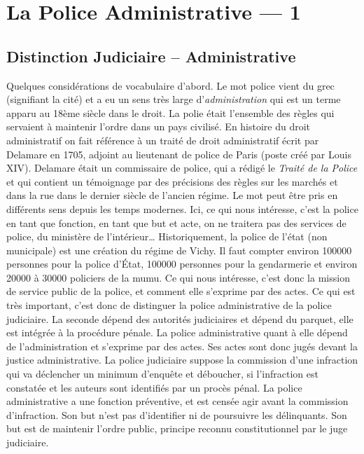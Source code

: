 \documentclass[math]{cours}
\begin{document}
\section{La Police Administrative --- 1}
\subsection{Distinction Judiciaire -- Administrative}
Quelques considérations de vocabulaire d'abord.
Le mot police vient du grec (signifiant la cité) et a eu un sens très large d'\emph{administration} qui est un terme apparu au 18ème siècle dans le droit.
La polie était l'ensemble des règles qui servaient à maintenir l'ordre dans un pays civilisé.
En histoire du droit administratif on fait référence à un traité de droit administratif écrit par Delamare en 1705, adjoint au lieutenant de police de Paris (poste créé par Louis XIV).
Delamare était un commissaire de police, qui a rédigé le \emph{Traité de la Police} et qui contient un témoignage par des précisions des règles sur les marchés et dans la rue dans le dernier siècle de l'ancien régime.
Le mot peut être pris en différents sens depuis les temps modernes.
Ici, ce qui nous intéresse, c'est la police en tant que fonction, en tant que but et acte, on ne traitera pas des services de police, du ministère de l'intérieur\ldots
Historiquement, la police de l'état (non municipale) est une création du régime de Vichy.
Il faut compter environ 100000 personnes pour la police d'État, 100000 personnes pour la gendarmerie et environ 20000 à 30000 policiers de la mumu.
Ce qui nous intéresse, c'est donc la mission de service public de la police, et comment elle s'exprime par des actes.
Ce qui est très important, c'est donc de distinguer la police administrative de la police judiciaire.
La seconde dépend des autorités judiciaires et dépend du parquet, elle est intégrée à la procédure pénale.
La police administrative quant à elle dépend de l'administration et s'exprime par des actes.
Ses actes sont donc jugés devant la justice administrative.
La police judiciaire suppose la commission d'une infraction qui va déclencher un minimum d'enquête et déboucher, si l'infraction est constatée et les auteurs sont identifiés par un procès pénal.
La police administrative a une fonction préventive, et est censée agir avant la commission d'infraction. Son but n'est pas d'identifier ni de poursuivre les délinquants.
Son but est de maintenir l'ordre public, principe reconnu constitutionnel par le juge judiciaire.
\end{document}
